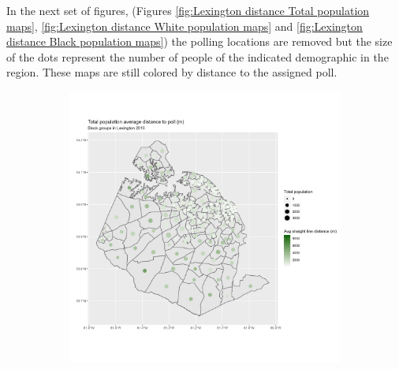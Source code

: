 \documentclass[11pt]{article}
\theoremstyle{remark}
\theoremstyle{definition}
\begin{document}
In the next set of figures, (Figures \ref{fig:Lexington distance Total population maps}, \ref{fig:Lexington distance White population maps} and \ref{fig:Lexington distance Black population maps}) the polling locations are removed but the size of the dots represent the number of people of the indicated demographic in the region. These maps are still colored by distance to the assigned poll.

\begin{figure}
	\begin{subfigure}{.5\textwidth}
		\centering
		\includegraphics[width=\linewidth]{result_analysis/Lexington_County_SC_original_configs/population_pop_and_dist_Lexington_config_original_2016_polls.png}
		\label{sfig:York_2016_bg_dist_pop}
	\end{subfigure} 
	\begin{subfigure}{.5\textwidth}
		\centering

\end{subfigure}
\end{figure}
\end{document}

